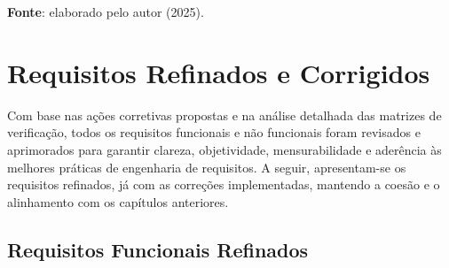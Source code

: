 \begin{center}\textbf{Fonte}: elaborado pelo autor (2025).\end{center}

\section{Requisitos Refinados e Corrigidos}

Com base nas ações corretivas propostas e na análise detalhada das matrizes de verificação, todos os requisitos funcionais e não funcionais foram revisados e aprimorados para garantir clareza, objetividade, mensurabilidade e aderência às melhores práticas de engenharia de requisitos. A seguir, apresentam-se os requisitos refinados, já com as correções implementadas, mantendo a coesão e o alinhamento com os capítulos anteriores.

\subsection{Requisitos Funcionais Refinados}

